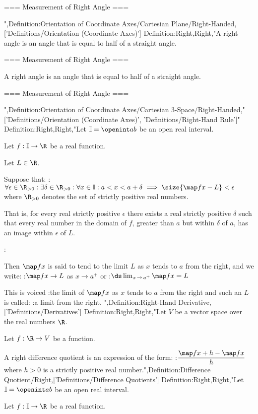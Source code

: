 === Measurement of Right Angle ===

",Definition:Orientation of Coordinate Axes/Cartesian Plane/Right-Handed,['Definitions/Orientation (Coordinate Axes)']
Definition:Right,Right,"A right angle is an angle that is equal to half of a straight angle.


=== Measurement of Right Angle ===

A right angle is an angle that is equal to half of a straight angle.


=== Measurement of Right Angle ===

",Definition:Orientation of Coordinate Axes/Cartesian 3-Space/Right-Handed,"['Definitions/Orientation (Coordinate Axes)', 'Definitions/Right-Hand Rule']"
Definition:Right,Right,"Let $\Bbb I = \openint a b$ be an open real interval.

Let $f: \Bbb I \to \R$ be a real function.

Let $L \in \R$.


Suppose that:
:$\forall \epsilon \in \R_{>0}: \exists \delta \in \R_{>0}: \forall x \in \Bbb I: a < x < a + \delta \implies \size {\map f x - L} < \epsilon$
where $\R_{>0}$ denotes the set of strictly positive real numbers.

That is, for every real strictly positive $\epsilon$ there exists a real strictly positive $\delta$ such that every real number in the domain of $f$, greater than $a$ but within $\delta$ of $a$, has an image within $\epsilon$ of $L$.


:

Then $\map f x$ is said to tend to the limit $L$ as $x$ tends to $a$ from the right, and we write:
:$\map f x \to L$ as $x \to a^+$
or
:$\ds \lim_{x \mathop \to a^+} \map f x = L$


This is voiced
:the limit of $\map f x$ as $x$ tends to $a$ from the right
and such an $L$ is called:
:a limit from the right.
",Definition:Right-Hand Derivative,['Definitions/Derivatives']
Definition:Right,Right,"Let $V$ be a vector space over the real numbers $\R$.

Let $f: \R \to V$ be a function.


A right difference quotient is an expression of the form:
:$\dfrac {\map f {x + h} - \map f x} h$
where $h > 0$ is a strictly positive real number.",Definition:Difference Quotient/Right,['Definitions/Difference Quotients']
Definition:Right,Right,"Let $\Bbb I = \openint a b$ be an open real interval.

Let $f: \Bbb I \to \R$ be a real function.

